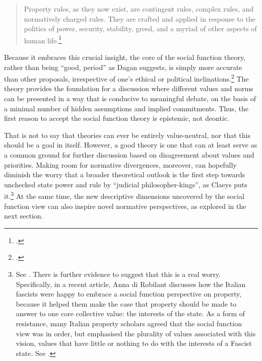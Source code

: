 \begin{quote}
Property rules, as they now exist, are contingent rules, complex rules, and normatively charged rules. They are crafted and applied in response to the politics of power, security, stability, greed, and a myriad of other aspects of human life.\footnote{\cite[376]{underkuffler10}.}
\end{quote}

Because it embraces this crucial insight, the core of the social function theory, rather than being ``good, period'' as Dagan suggests, is simply more accurate than other proposals, irrespective of one's ethical or political inclinations.\footcite[1259]{dagan07} The theory provides the foundation for a discussion where different values and norms can be presented in a way that is conducive to meaningful debate, on the basis of a minimal number of hidden assumptions and implied commitments. Thus, the first reason to accept the social function theory is epistemic, not deontic.

That is not to say that theories can ever be entirely value-neutral, nor that this should be a goal in itself. However, a good theory is one that can at least serve as a common ground for further discussion based on disagreement about values and priorities.  Making room for normative divergences, moreover, can hopefully diminish the worry that a broader theoretical outlook is the first step towards unchecked state power and rule by ``judicial philosopher-kings'', as Claeys puts it.\footnote{See \cite[944]{claeys09}. There is further evidence to suggest that this is a real worry. Specifically, in a recent article, Anna di Robilant discusses how the Italian fascists were happy to embrace a social function perspective on property, because it helped them make the case that property should be made to answer to one core collective value: the interests of the state. As a form of resistance, many Italian property scholars agreed that the social function view was in order, but emphasised the plurality of values associated with this vision, values that have little or nothing to do with the interests of a Fascist state. See \cite{robilant13}.} At the same time, the new descriptive dimensions uncovered by the social function view can also inspire novel normative perspectives, as explored in the next section.

